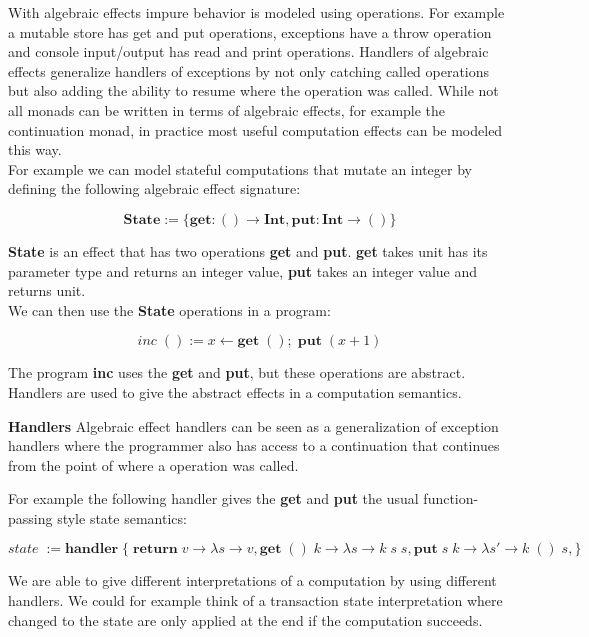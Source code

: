{With algebraic effects impure behavior is modeled using operations.
For example a mutable store has get and put operations, exceptions have a throw operation and console input/output has read and print operations.
Handlers of algebraic effects generalize handlers of exceptions by not only catching called operations but also adding the ability to resume where the operation was called.
While not all monads can be written in terms of algebraic effects, for example the continuation monad, in practice most useful computation effects can be modeled this way.
\\
For example we can model stateful computations that mutate an integer by defining the following algebraic effect signature:

\[ \textbf{State} := \{ \textbf{get} : () \rightarrow \textbf{Int}, \textbf{put} : \textbf{Int} \rightarrow () \} \]

\textbf{State} is an effect that has two operations \textbf{get} and \textbf{put}. \textbf{get} takes unit has its parameter type and returns an integer value, \textbf{put} takes an integer value and returns unit.
\\
We can then use the \textbf{State} operations in a program:

\[ \textit{inc} \; () := x \leftarrow \textbf{get} \; () ;\; \textbf{put} \; (x + 1) \]

The program \textbf{inc} uses the \textbf{get} and \textbf{put}, but these operations are abstract.
Handlers are used to give the abstract effects in a computation semantics.

\textbf{Handlers}
Algebraic effect handlers can be seen as a generalization of exception handlers where the programmer also has access
to a continuation that continues from the point of where a operation was called.

For example the following handler gives the \textbf{get} and \textbf{put} the usual function-passing style state semantics:

\[ \textit{state} \; := \textbf{handler} \; \{ \;
  \textbf{return} \; v \rightarrow \lambda s \rightarrow v,
  \textbf{get} \; () \; k \rightarrow \lambda s \rightarrow k \; s \; s,
  \textbf{put} \; s \; k \rightarrow \lambda s' \rightarrow k \; () \; s,
\} \]

We are able to give different interpretations of a computation by using different handlers.
We could for example think of a transaction state interpretation where changed to the state are only applied at the end if the computation succeeds.

}

